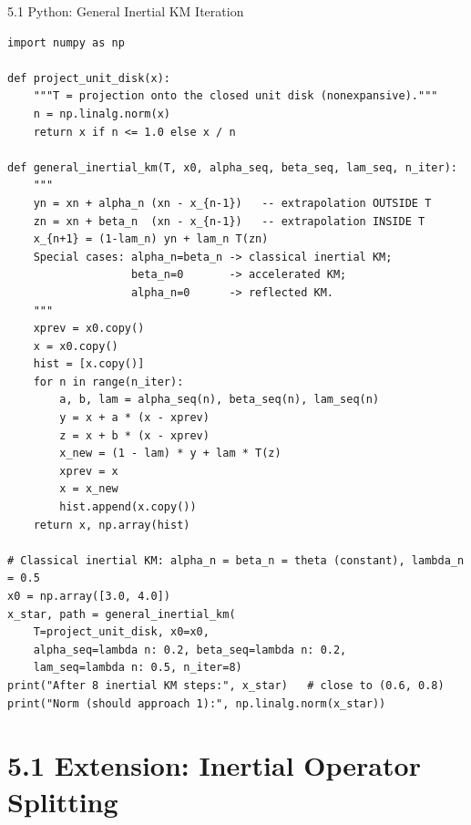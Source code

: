 \documentclass[aspectratio=169,10pt]{beamer}
\begin{document}
\begin{frame}[fragile]{5.1 Python: General Inertial KM Iteration}
\begin{lstlisting}[caption={General inertial KM iteration (Python/NumPy)}]
import numpy as np

def project_unit_disk(x):
    """T = projection onto the closed unit disk (nonexpansive)."""
    n = np.linalg.norm(x)
    return x if n <= 1.0 else x / n

def general_inertial_km(T, x0, alpha_seq, beta_seq, lam_seq, n_iter):
    """
    yn = xn + alpha_n (xn - x_{n-1})   -- extrapolation OUTSIDE T
    zn = xn + beta_n  (xn - x_{n-1})   -- extrapolation INSIDE T
    x_{n+1} = (1-lam_n) yn + lam_n T(zn)
    Special cases: alpha_n=beta_n -> classical inertial KM;
                   beta_n=0       -> accelerated KM;
                   alpha_n=0      -> reflected KM.
    """
    xprev = x0.copy()
    x = x0.copy()
    hist = [x.copy()]
    for n in range(n_iter):
        a, b, lam = alpha_seq(n), beta_seq(n), lam_seq(n)
        y = x + a * (x - xprev)
        z = x + b * (x - xprev)
        x_new = (1 - lam) * y + lam * T(z)
        xprev = x
        x = x_new
        hist.append(x.copy())
    return x, np.array(hist)

# Classical inertial KM: alpha_n = beta_n = theta (constant), lambda_n = 0.5
x0 = np.array([3.0, 4.0])
x_star, path = general_inertial_km(
    T=project_unit_disk, x0=x0,
    alpha_seq=lambda n: 0.2, beta_seq=lambda n: 0.2,
    lam_seq=lambda n: 0.5, n_iter=8)
print("After 8 inertial KM steps:", x_star)   # close to (0.6, 0.8)
print("Norm (should approach 1):", np.linalg.norm(x_star))
\end{lstlisting}
\end{frame}

\section{5.1 Extension: Inertial Operator Splitting}
\end{document}
